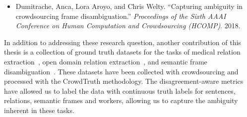\begin{itemize}
    \begin{itemize}
        \item Dumitrache, Anca, Lora Aroyo, and Chris Welty. ``Capturing ambiguity in crowdsourcing frame disambiguation.'' \textit{Proceedings of the Sixth AAAI Conference on Human Computation and Crowdsourcing (HCOMP)}. 2018.~\cite{DBLP:conf/hcomp/DumitracheAW18}
    \end{itemize}
\end{itemize}

In addition to addressing these research question, another contribution of this thesis is a collection of ground truth datasets for the tasks of medical relation extraction~\cite{anca_dumitrache_2016_50676}, open domain relation extraction~\cite{crowdODrelexdata2016}, and semantic frame disambiguation~\cite{anca_dumitrache_2018_1472345}. These datasets have been collected with crowdsourcing and processed with the CrowdTruth methodology. The disagreement-aware metrics have allowed us to label the data with continuous truth labels for sentences, relations, semantic frames and workers, allowing us to capture the ambiguity inherent in these tasks.






    

